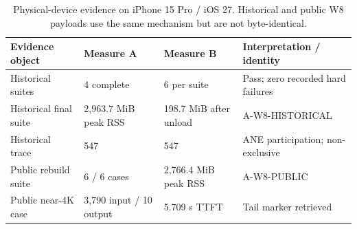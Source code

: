 \begin{table}[H]
\centering
\small
\setlength{\tabcolsep}{4pt}
\begin{tabularx}{\textwidth}{@{}p{}p{}p{}X@{}}
\toprule
Evidence object & Measure A & Measure B & Interpretation / identity \\
\midrule
Historical suites & 4 complete & 6 per suite & Pass; zero recorded hard failures \\
Historical final suite & 2,963.7 MiB peak RSS & 198.7 MiB after unload & A-W8-HISTORICAL \\
Historical trace & 547 & 547 & ANE participation; non-exclusive \\
Public rebuild suite & 6 / 6 cases & 2,766.4 MiB peak RSS & A-W8-PUBLIC \\
Public near-4K case & 3,790 input / 10 output & 5.709 s TTFT & Tail marker retrieved \\
\bottomrule
\end{tabularx}
\caption{Physical-device evidence on iPhone 15 Pro / iOS 27. Historical and public W8 payloads use the same mechanism but are not byte-identical. }
\label{tab:device-evidence}
\end{table}
